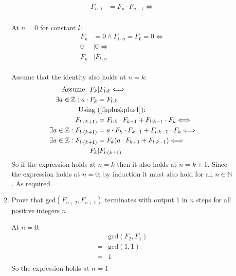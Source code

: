 \documentclass[10pt,\jkfside,a4paper]{article}
\begin{document}
\begin{enumerate}
\begin{enumerate}
\begin{equation}
\begin{split}
F_{n \cdot l} &= F_n \cdot F_{n + l} \Longleftrightarrow \\
\end{split}
\end{equation}

At $n = 0$ for constant $l$:
\begin{equation}
\begin{split}
F_n &= 0 \wedge F_{l\cdot n} = F_0 = 0\Longleftrightarrow\\
0 &| 0\Longleftrightarrow\\
F_n &| F_{l \cdot n}\\
\end{split}
\end{equation}

Assume that the identity also holds at $n = k$:
\begin{equation}
\begin{split}
\text{Assume: }F_k &| F_{l \cdot k} \Longleftrightarrow \\
\exists a \in \mathbb{Z}: a \cdot F_k &= F_{l\cdot k}\\
\text{Using }&\text{(\ref{fnpluskplus1}):}\\
F_{l \cdot (k + 1)} &= F_{l \cdot k}\cdot F_{k + 1} + F_{l \cdot k - 1} \cdot F_k \Longleftrightarrow\\
\exists a \in \mathbb{Z}: F_{l \cdot (k + 1)} &= a \cdot F_k \cdot F_{k + 1} + F_{l \cdot k - 1} \cdot F_k \Longleftrightarrow\\
\exists a \in \mathbb{Z}: F_{l \cdot (k + 1)} &= F_k (a \cdot F_{k + 1} + F_{l \cdot k - 1}) \Longleftrightarrow\\
F_k &| F_{l \cdot (k + 1)}\\
\end{split}
\end{equation}
So if the expression holds at $n = k$ then it also holds at $n = k + 1$. Since the expression holds at $n = 0$; 
by induction it must also hold for all $n \in \mathbb{N}$. As required.

\item Prove that gcd$(F_{n + 2}, F_{n + 1})$ terminates with output 1 in $n$ steps for all positive integers 
$n$.

At $n = 0$:
\begin{equation}
\begin{split}
 & \text{gcd}(F_2, F_1)\\
=& \text{gcd}(1, 1)\\
=& 1\\
\end{split}
\end{equation}
So the expression holds at $n = 1$


\end{enumerate}
\end{enumerate}
\end{document}
